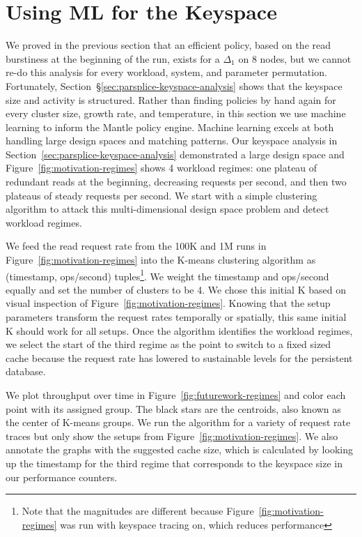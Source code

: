 \section{Using ML for the Keyspace}
\label{sec:ml-for-the-keyspace}

We proved in the previous section that an efficient policy, based on the read
burstiness at the beginning of the run,  exists for a \(\Delta_1\) on 8
nodes, but we cannot re-do this analysis for every workload, system, and
parameter permutation.  Fortunately,
Section~\S\ref{sec:parsplice-keyspace-analysis} shows that the keyspace size
and activity is structured. Rather than finding policies by hand again for
every cluster size, growth rate, and temperature, in this section we use
machine learning to inform the Mantle policy engine.  Machine learning excels
at both handling large design spaces and matching patterns. Our keyspace
analysis in Section~\ref{sec:parsplice-keyspace-analysis} demonstrated a large
design space and Figure~\ref{fig:motivation-regimes} shows 4 workload regimes:
one plateau of redundant reads at the beginning, decreasing requests per
second, and then two plateaus of steady requests per second. We start with a
simple clustering algorithm to attack this multi-dimensional design space
problem and detect workload regimes.

We feed the read request rate from the 100K and 1M runs in
Figure~\ref{fig:motivation-regimes} into the K-means clustering algorithm as
(timestamp, ops/second) tuples\footnote{Note that the magnitudes are different
because Figure~\ref{fig:motivation-regimes} was run with keyspace tracing on,
which reduces performance}. We weight the timestamp and ops/second equally and
set the number of clusters to be 4.  We chose this initial K  based on visual
inspection of Figure~\ref{fig:motivation-regimes}. Knowing that the setup
parameters transform the request rates temporally or spatially, this same
initial K should work for all setups. Once the algorithm identifies the
workload regimes, we select the start of the third regime as the point to
switch to a fixed sized cache because the request rate has lowered to
sustainable levels for the persistent database.

We plot throughput over time in Figure~\ref{fig:futurework-regimes} and
color each point with its assigned group. The black stars are the centroids,
also known as the center of K-means groups.  We run the algorithm for a variety
of request rate traces but only show the setups from
Figure~\ref{fig:motivation-regimes}. We also annotate the graphs with the
suggested cache size, which is calculated by looking up the timestamp for the
third regime that corresponds to the keyspace size in our performance counters.

